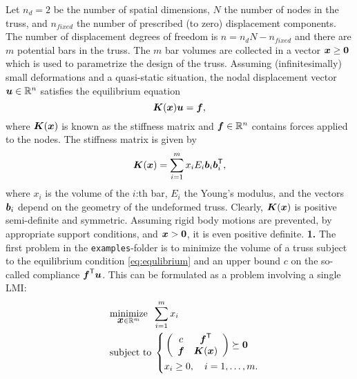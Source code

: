 \documentclass{article}
\newcommand{\bm}[1]{\mbox{\boldmath $#1$}}
\newcommand{\T}{\textsf{T}}
\begin{document}
Let $n_{d} = 2$ be the number of spatial dimensions, $N$ the number of nodes in the truss, and $n_{fixed}$ the number of prescribed (to zero) displacement components. The number of displacement degrees of freedom is $n=n_{d}N-n_{fixed}$ and there are $m$ potential bars in the truss.
The $m$ bar volumes are collected in a vector $\bm{x}\geq\bm{0}$ which is used to parametrize the design of the truss. Assuming (infinitesimally) small deformations and a quasi-static situation, the nodal displacement vector $\bm{u}\in\mathbb{R}^{n}$ satisfies the equilibrium equation
\begin{equation}\label{eq:equlibrium}
\bm{K}(\bm{x})\bm{u} = \bm{f},
\end{equation}
where $\bm{K}(\bm{x})$ is known as the stiffness matrix and $\bm{f}\in\mathbb{R}^{n}$ contains forces applied to the nodes. The  stiffness matrix is given by
\begin{equation}\nonumber
\bm{K}(\bm{x}) = \sum_{i=1}^{m}x_{i}E_{i}\bm{b}_{i}\bm{b}_{i}^{\T},
\end{equation}
where $x_{i}$ is the volume of the $i$:th bar, $E_{i}$ the Young's modulus, and the vectors $\bm{b}_{i}$ depend on the geometry of the undeformed truss. Clearly, $\bm{K}(\bm{x})$ is positive semi-definite and symmetric. Assuming rigid body motions are prevented, by appropriate support conditions, and $\bm{x}>\bm{0}$, it is even positive definite.
\vskip2mm
\noindent\textbf{1.} The first problem in the \texttt{examples}-folder is to minimize the volume of a truss subject to the equilibrium condition \eqref{eq:equlibrium} and an upper bound $c$ on the so-called compliance $\bm{f}^{\T}\bm{u}$. This can be formulated as a problem involving a single LMI: 
\begin{equation}\label{eq:prob1}
\quad
	\begin{aligned}
	&	\underset{\bm{x}\in\mathbb{R}^{m}}{\mbox{minimize}} \;\; \sum_{i=1}^{m}x_{i} \\
	&	\mbox{subject to} \;
	\left\{
		\begin{aligned}
		  & \left(
\begin{array}{cc}
c &\bm{f}^{\T}         \\
\bm{f} & \bm{K}(\bm{x})
\end{array}
\right) \succeq \bm{0} \\
			& x_{i} \geq 0 , \quad i=1,\ldots,m.
		\end{aligned}
		\right.
	\end{aligned}
\end{equation}
\end{document}
